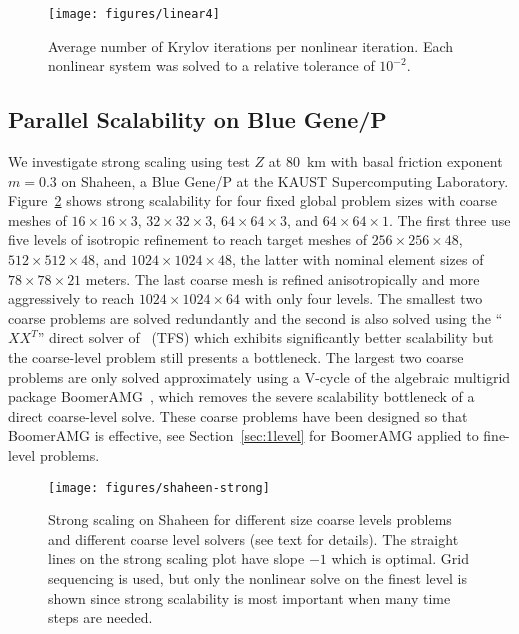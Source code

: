 \documentclass[draft,lineno,jgrga]{AGUTeX}
\begin{document}
\begin{article}
\begin{figure}
  \texttt{[image: figures/linear4]}
  \centering\caption{Average number of Krylov iterations per nonlinear iteration.  Each nonlinear system was solved to a relative tolerance of $10^{-2}$.}\label{fig:linear}
\end{figure}

\subsection{Parallel Scalability on Blue Gene/P}\label{sec:pscaling}
We investigate strong scaling using test $Z$ at \SI{80}{\kilo\metre} with basal friction exponent $m= 0.3$ on Shaheen, a Blue Gene/P at the KAUST Supercomputing Laboratory.
Figure~\ref{fig:shaheen-strong} shows strong scalability for four fixed global problem sizes with coarse meshes of $16\times 16\times 3$, $32\times 32\times 3$, $64\times 64\times 3$, and $64\times 64\times 1$.
The first three use five levels of isotropic refinement to reach target meshes of $256\times 256\times 48$, $512\times 512\times 48$, and $1024\times 1024\times 48$, the latter with nominal element sizes of $78\times 78\times 21$ meters.
The last coarse mesh is refined anisotropically and more aggressively to reach $1024\times 1024\times 64$ with only four levels.
The smallest two coarse problems are solved redundantly and the second is also solved using the ``$XX^T$'' direct solver of~\cite{tufo2001fast} (TFS) which exhibits significantly better scalability but the coarse-level problem still presents a bottleneck.
The largest two coarse problems are only solved approximately using a V-cycle of the algebraic multigrid package BoomerAMG~\citep{henson2002bpa}, which removes the severe scalability bottleneck of a direct coarse-level solve.
These coarse problems have been designed so that BoomerAMG is effective, see Section~\ref{sec:1level} for BoomerAMG applied to fine-level problems.

\begin{figure}
  \texttt{[image: figures/shaheen-strong]}
  \centering\caption{Strong scaling on Shaheen for different size coarse levels problems and different coarse level solvers (see text for details).
    The straight lines on the strong scaling plot have slope $-1$ which is optimal.
    Grid sequencing is used, but only the nonlinear solve on the finest level is shown since strong scalability is most important when many time steps are needed.}\label{fig:shaheen-strong}
\end{figure}


\end{article}
\end{document}
